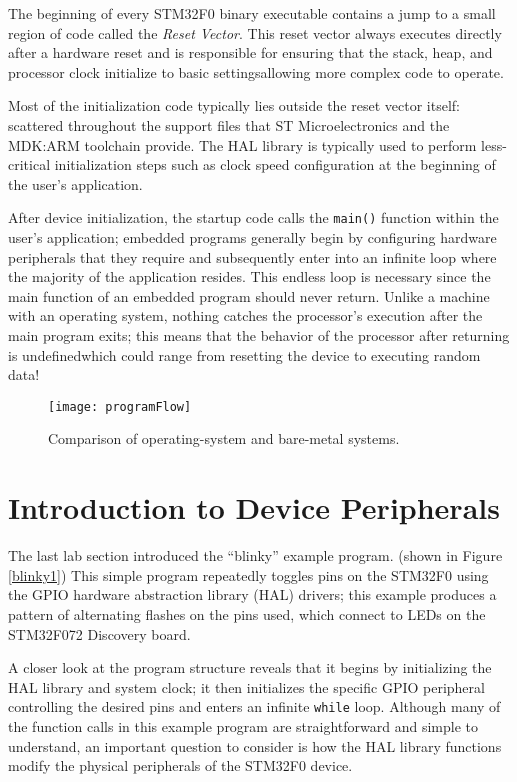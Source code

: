 \documentclass[11pt,fleqn]{book} %
\begin{document}
The beginning of every STM32F0 binary executable contains a jump to a small region of code called the \textit{Reset Vector}. This reset vector always executes directly after a hardware reset and is responsible for ensuring that the stack, heap, and processor clock initialize to basic settings\textemdash allowing more complex code to operate.

Most of the initialization code typically lies outside the reset vector itself: scattered throughout the support files that ST Microelectronics and the MDK:ARM toolchain provide. The HAL library is typically used to perform less-critical initialization steps such as clock speed configuration at the beginning of the user's application. 

After device initialization, the startup code calls the \texttt{main()} function within the user's application; embedded programs generally begin by configuring hardware peripherals that they require and subsequently enter into an infinite loop where the majority of the application resides. This endless loop is necessary since the main function of an embedded program should never return. Unlike a machine with an operating system, nothing catches the processor's execution after the main program exits; this means that the behavior of the processor after returning is undefined\textemdash which could range from resetting the device to executing random data!

\begin{figure}[]
    \centering\texttt{[image: programFlow]}
    \caption{Comparison of operating-system and bare-metal systems. }
    \label{programFlow}
\end{figure}


\section{Introduction to Device Peripherals}

The last lab section introduced the ``blinky'' example program. (shown in Figure \vref{blinky1}) This simple program repeatedly toggles pins on the STM32F0 using the GPIO hardware abstraction library (HAL) drivers; this example produces a pattern of alternating flashes on the pins used, which connect to LEDs on the STM32F072 Discovery board. 

A closer look at the program structure reveals that it begins by initializing the HAL library and system clock; it then initializes the specific GPIO peripheral controlling the desired pins and enters an infinite \texttt{while} loop. Although many of the function calls in this example program are straightforward and simple to understand, an important question to consider is how the HAL library functions modify the physical peripherals of the STM32F0 device.
\end{document}
